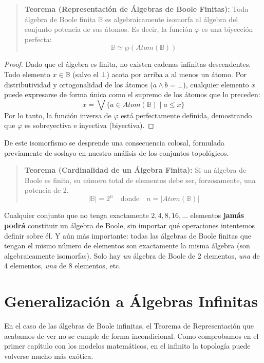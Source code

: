 \begin{quote}\textbf{Teorema (Representación de Álgebras de Boole Finitas):}\label{rep_stone}
Toda álgebra de Boole finita $\mathbb{B}$ es algebraicamente isomorfa al álgebra del conjunto potencia de sus átomos. Es decir, la función $\varphi$ es una biyección perfecta:
\[ \mathbb{B} \simeq \wp(\mathit{Atom}(\mathbb{B})) \]
\end{quote}
\begin{proof}
Dado que el álgebra es finita, no existen cadenas infinitas descendentes. Todo elemento $x \in \mathbb{B}$ (salvo el $\bot$) acota por arriba a al menos un átomo. Por distributividad y ortogonalidad de los átomos ($a \wedge b = \bot$), cualquier elemento $x$ puede expresarse de forma única como el supremo de los átomos que lo preceden: 
\[ x = \bigvee \{ a \in \mathit{Atom}(\mathbb{B}) \mid a \le x \} \]
Por lo tanto, la función inversa de $\varphi$ está perfectamente definida, demostrando que $\varphi$ es sobreyectiva e inyectiva (biyectiva).
\end{proof}

De este isomorfismo se desprende una consecuencia colosal, formulada previamente de soslayo en nuestro análisis de los conjuntos topológicos.

\begin{quote}\textbf{Teorema (Cardinalidad de un Álgebra Finita):}\label{cardinalidad}
Si un álgebra de Boole es finita, su número total de elementos debe ser, forzosamente, una potencia de 2.
\[ |\mathbb{B}| = 2^n \quad \text{donde} \quad n = |\mathit{Atom}(\mathbb{B})| \]
\end{quote}

Cualquier conjunto que no tenga exactamente $2, 4, 8, 16, \ldots$ elementos \textbf{jamás podrá} constituir un álgebra de Boole, sin importar qué operaciones intentemos definir sobre él. Y aún más importante: todas las álgebras de Boole finitas que tengan el mismo número de elementos son exactamente la misma álgebra (son algebraicamente isomorfas). Solo hay \textit{un} álgebra de Boole de 2 elementos, \textit{una} de 4 elementos, \textit{una} de 8 elementos, etc.

\section{Generalización a Álgebras Infinitas}

En el caso de las álgebras de Boole infinitas, el Teorema de Representación que acabamos de ver no se cumple de forma incondicional. Como comprobamos en el primer capítulo con los modelos matemáticos, en el infinito la topología puede volverse mucho más exótica. 

